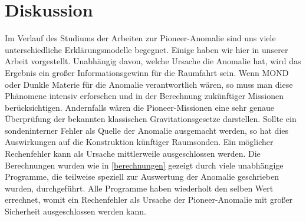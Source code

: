 \section{Diskussion}

Im Verlauf des Studiums der Arbeiten zur Pioneer-Anomalie sind uns viele unterschiedliche Erklärungsmodelle begegnet. Einige haben wir hier in unserer Arbeit vorgestellt. Unabhängig davon, welche Ursache die Anomalie hat, wird das Ergebnis ein großer Informationsgewinn für die Raumfahrt sein. Wenn MOND oder Dunkle Materie für die Anomalie verantwortlich wären, so muss man diese Phänomene intensiv erforschen und in der Berechnung zukünftiger Missionen berücksichtigen. Andernfalls wären die Pioneer-Missionen eine sehr genaue Überprüfung der bekannten klassischen Gravitationsgesetze darstellen. Sollte ein sondeninterner Fehler als Quelle der Anomalie ausgemacht werden, so hat dies Auswirkungen auf die Konstruktion künftiger Raumsonden. Ein möglicher Rechenfehler kann als Ursache mittlerweile ausgeschlossen werden. Die Berechnungen wurden wie in \ref{berechnungen} gezeigt durch viele unabhängige Programme, die teilweise speziell zur Auswertung der Anomalie geschrieben wurden, durchgeführt. Alle Programme haben wiederholt den selben Wert errechnet, womit ein Rechenfehler als Ursache der Pioneer-Anomalie mit großer Sicherheit ausgeschlossen werden kann.

\bigskip
